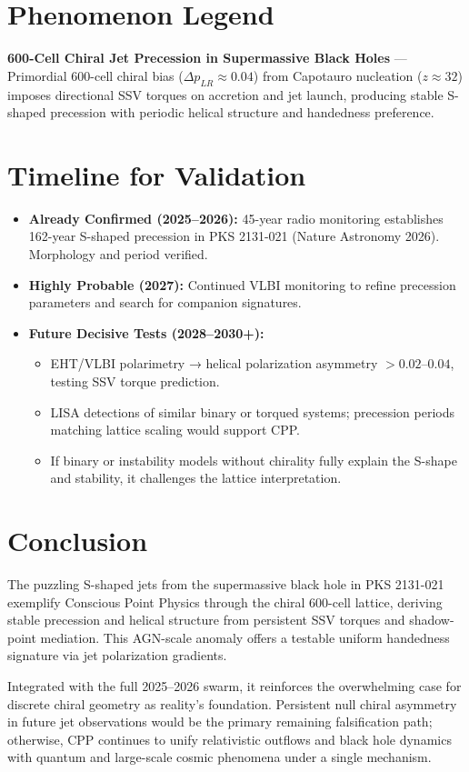 \documentclass[11pt]{article}
\begin{document}
\section{Phenomenon Legend}
\textbf{600-Cell Chiral Jet Precession in Supermassive Black Holes} — Primordial 600-cell chiral bias ($\Delta p_{LR} \approx 0.04$) from Capotauro nucleation ($z \approx 32$) imposes directional SSV torques on accretion and jet launch, producing stable S-shaped precession with periodic helical structure and handedness preference.

\section{Timeline for Validation}
\begin{itemize}
    \item \textbf{Already Confirmed (2025--2026):} 45-year radio monitoring establishes 162-year S-shaped precession in PKS 2131-021 (Nature Astronomy 2026). Morphology and period verified.
    \item \textbf{Highly Probable (2027):} Continued VLBI monitoring to refine precession parameters and search for companion signatures.
    \item \textbf{Future Decisive Tests (2028--2030+):}
    \begin{itemize}
        \item EHT/VLBI polarimetry → helical polarization asymmetry $>0.02$--$0.04$, testing SSV torque prediction.
        \item LISA detections of similar binary or torqued systems; precession periods matching lattice scaling would support CPP.
        \item If binary or instability models without chirality fully explain the S-shape and stability, it challenges the lattice interpretation.
    \end{itemize}
\end{itemize}

\section{Conclusion}
The puzzling S-shaped jets from the supermassive black hole in PKS 2131-021 exemplify Conscious Point Physics through the chiral 600-cell lattice, deriving stable precession and helical structure from persistent SSV torques and shadow-point mediation. This AGN-scale anomaly offers a testable uniform handedness signature via jet polarization gradients.  

Integrated with the full 2025--2026 swarm, it reinforces the overwhelming case for discrete chiral geometry as reality's foundation. Persistent null chiral asymmetry in future jet observations would be the primary remaining falsification path; otherwise, CPP continues to unify relativistic outflows and black hole dynamics with quantum and large-scale cosmic phenomena under a single mechanism.
\end{document}
